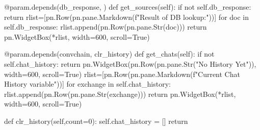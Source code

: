 \documentclass[
  letterpaper,
  DIV=11,
  numbers=noendperiod]{scrreprt}
\newenvironment{Shaded}{\begin{snugshade}}{\end{snugshade}}
\newcommand{\AttributeTok}[1]{\textcolor[rgb]{0.40,0.45,0.13}{#1}}
\newcommand{\ControlFlowTok}[1]{\textcolor[rgb]{0.00,0.23,0.31}{#1}}
\newcommand{\DecValTok}[1]{\textcolor[rgb]{0.68,0.00,0.00}{#1}}
\newcommand{\KeywordTok}[1]{\textcolor[rgb]{0.00,0.23,0.31}{#1}}
\newcommand{\NormalTok}[1]{\textcolor[rgb]{0.00,0.23,0.31}{#1}}
\newcommand{\OperatorTok}[1]{\textcolor[rgb]{0.37,0.37,0.37}{#1}}
\newcommand{\SpecialStringTok}[1]{\textcolor[rgb]{0.13,0.47,0.30}{#1}}
\newcommand{\StringTok}[1]{\textcolor[rgb]{0.13,0.47,0.30}{#1}}
\newcommand{\VariableTok}[1]{\textcolor[rgb]{0.07,0.07,0.07}{#1}}
\begin{document}
\begin{Shaded}
\begin{Highlighting}[]
    \AttributeTok{@param.depends}\NormalTok{(}\StringTok{\textquotesingle{}db\_response\textquotesingle{}}\NormalTok{, )}
    \KeywordTok{def}\NormalTok{ get\_sources(}\VariableTok{self}\NormalTok{):}
        \ControlFlowTok{if} \KeywordTok{not} \VariableTok{self}\NormalTok{.db\_response:}
            \ControlFlowTok{return}
\NormalTok{        rlist}\OperatorTok{=}\NormalTok{[pn.Row(pn.pane.Markdown(}\SpecialStringTok{f"Result of DB lookup:"}\NormalTok{))]}
        \ControlFlowTok{for}\NormalTok{ doc }\KeywordTok{in} \VariableTok{self}\NormalTok{.db\_response:}
\NormalTok{            rlist.append(pn.Row(pn.pane.Str(doc)))}
        \ControlFlowTok{return}\NormalTok{ pn.WidgetBox(}\OperatorTok{*}\NormalTok{rlist, width}\OperatorTok{=}\DecValTok{600}\NormalTok{, scroll}\OperatorTok{=}\VariableTok{True}\NormalTok{)}

    \AttributeTok{@param.depends}\NormalTok{(}\StringTok{\textquotesingle{}convchain\textquotesingle{}}\NormalTok{, }\StringTok{\textquotesingle{}clr\_history\textquotesingle{}}\NormalTok{)}
    \KeywordTok{def}\NormalTok{ get\_chats(}\VariableTok{self}\NormalTok{):}
        \ControlFlowTok{if} \KeywordTok{not} \VariableTok{self}\NormalTok{.chat\_history:}
            \ControlFlowTok{return}\NormalTok{ pn.WidgetBox(pn.Row(pn.pane.Str(}\StringTok{"No History Yet"}\NormalTok{)), width}\OperatorTok{=}\DecValTok{600}\NormalTok{, scroll}\OperatorTok{=}\VariableTok{True}\NormalTok{)}
\NormalTok{        rlist}\OperatorTok{=}\NormalTok{[pn.Row(pn.pane.Markdown(}\SpecialStringTok{f"Current Chat History variable"}\NormalTok{))]}
        \ControlFlowTok{for}\NormalTok{ exchange }\KeywordTok{in} \VariableTok{self}\NormalTok{.chat\_history:}
\NormalTok{            rlist.append(pn.Row(pn.pane.Str(exchange)))}
        \ControlFlowTok{return}\NormalTok{ pn.WidgetBox(}\OperatorTok{*}\NormalTok{rlist, width}\OperatorTok{=}\DecValTok{600}\NormalTok{, scroll}\OperatorTok{=}\VariableTok{True}\NormalTok{)}

    \KeywordTok{def}\NormalTok{ clr\_history(}\VariableTok{self}\NormalTok{,count}\OperatorTok{=}\DecValTok{0}\NormalTok{):}
        \VariableTok{self}\NormalTok{.chat\_history }\OperatorTok{=}\NormalTok{ []}
        \ControlFlowTok{return}
\end{Highlighting}
\end{Shaded}
\end{document}
